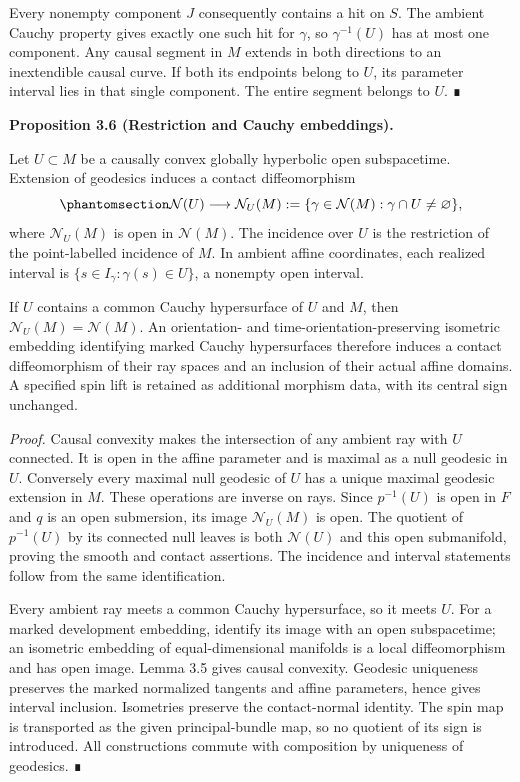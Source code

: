 \documentclass[
  english,
  11pt,
  reqno]{amsart}
\makeatletter
\newcounter{none} %
\newcommand{\pandocstatementheading}[1]{%
  \par\if@nobreak\else
    \addpenalty{\@beginparpenalty}%
    \addvspace{.5\baselineskip plus .2\baselineskip minus .2\baselineskip}%
  \fi
  {\normalfont\bfseries #1\par}%
  \nobreak\@afterindenttrue\@afterheading
}
\makeatother
\begin{document}
Every nonempty component \(J\) consequently contains a hit on \(S\). The
ambient Cauchy property gives exactly one such hit for \(\gamma\), so
\(\gamma^{-1}(U)\) has at most one component. Any causal segment in
\(M\) extends in both directions to an inextendible causal curve. If
both its endpoints belong to \(U\), its parameter interval lies in that
single component. The entire segment belongs to \(U\). ∎

\pandocstatementheading{\protect{}\label{prop:global-ray-restriction}Proposition 3.6 (Restriction and Cauchy embeddings).}

Let \(U\subset M\) be a causally convex globally hyperbolic open
subspacetime. Extension of geodesics induces a contact diffeomorphism
\begin{equation}\protect\phantomsection\label{eq:global-ray-restriction}{
\mathcal N(U)\longrightarrow
\mathcal N_U(M):=\{\gamma\in\mathcal N(M):\gamma\cap U\ne\varnothing\},
}\end{equation} where \(\mathcal N_U(M)\) is open in \(\mathcal N(M)\).
The incidence over \(U\) is the restriction of the point-labelled
incidence of \(M\). In ambient affine coordinates, each realized
interval is \(\{s\in I_\gamma:\gamma(s)\in U\}\), a nonempty open
interval.

If \(U\) contains a common Cauchy hypersurface of \(U\) and \(M\), then
\(\mathcal N_U(M)=\mathcal N(M)\). An orientation- and
time-orientation-preserving isometric embedding identifying marked
Cauchy hypersurfaces therefore induces a contact diffeomorphism of their
ray spaces and an inclusion of their actual affine domains. A specified
spin lift is retained as additional morphism data, with its central sign
unchanged.

\emph{Proof.} Causal convexity makes the intersection of any ambient ray
with \(U\) connected. It is open in the affine parameter and is maximal
as a null geodesic in \(U\). Conversely every maximal null geodesic of
\(U\) has a unique maximal geodesic extension in \(M\). These operations
are inverse on rays. Since \(p^{-1}(U)\) is open in \(F\) and \(q\) is
an open submersion, its image \(\mathcal N_U(M)\) is open. The quotient
of \(p^{-1}(U)\) by its connected null leaves is both \(\mathcal N(U)\)
and this open submanifold, proving the smooth and contact assertions.
The incidence and interval statements follow from the same
identification.

Every ambient ray meets a common Cauchy hypersurface, so it meets \(U\).
For a marked development embedding, identify its image with an open
subspacetime; an isometric embedding of equal-dimensional manifolds is a
local diffeomorphism and has open image. Lemma 3.5 gives causal
convexity. Geodesic uniqueness preserves the marked normalized tangents
and affine parameters, hence gives interval inclusion. Isometries
preserve the contact-normal identity. The spin map is transported as the
given principal-bundle map, so no quotient of its sign is introduced.
All constructions commute with composition by uniqueness of geodesics. ∎
\end{document}
